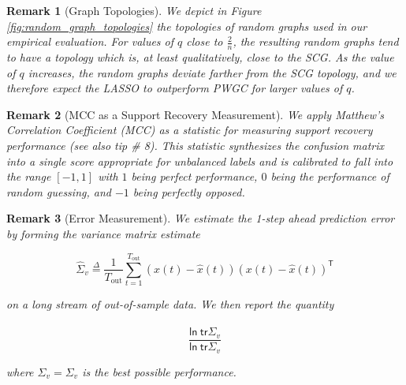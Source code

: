 \documentclass{statsoc}
\newtheorem{remark}{Remark}
\def\defeq{\overset{\Delta}{=}}  %
\def\ln{\mathsf{ln\ }}  %
\def\tr{\mathsf{tr }}  %
\def\T{\mathsf{T}}  %
\begin{document}
\begin{remark}[Graph Topologies]
  We depict in Figure \ref{fig:random_graph_topologies} the topologies
  of random graphs used in our empirical evaluation.  For values of
  $q$ close to $\frac{2}{n}$, the resulting random graphs tend to have
  a topology which is, at least qualitatively, close to the SCG.  As
  the value of $q$ increases, the random graphs deviate farther from
  the SCG topology, and we therefore expect the LASSO to outperform
  PWGC for larger values of $q$.
\end{remark}

\begin{remark}[MCC as a Support Recovery Measurement]
  We apply Matthew's Correlation Coefficient (MCC)
  \cite{matthews1975comparison} as a statistic for measuring support
  recovery performance (see also \cite{chicco2017ten} tip \# 8).  This
  statistic synthesizes the confusion matrix into a single score
  appropriate for unbalanced labels and is calibrated to fall into the
  range $[-1, 1]$ with $1$ being perfect performance, $0$ being the
  performance of random guessing, and $-1$ being perfectly opposed.
\end{remark}

\begin{remark}[Error Measurement]
  We estimate the 1-step ahead prediction error by forming the variance matrix estimate

  \begin{equation*}
    \widehat{\Sigma}_v \defeq \frac{1}{T_{\text{out}}} \sum_{t = 1}^{T_{\text{out}}} (x(t) - \widehat{x}(t))(x(t) - \widehat{x}(t))^\T
  \end{equation*}

  on a long stream of out-of-sample data.  We then report the quantity

  \begin{equation*}
    \frac{\ln \tr \widehat{\Sigma}_v}{\ln \tr \Sigma_v}
  \end{equation*}

  where $\widehat{\Sigma}_v = \Sigma_v$ is the best possible performance.
\end{remark}
\end{document}

